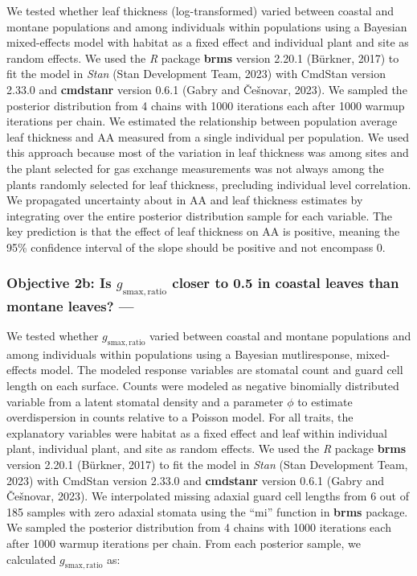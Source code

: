 \documentclass[
  letterpaper,
  DIV=11,
  numbers=noendperiod]{scrartcl}
\begin{document}
We tested whether leaf thickness (log-transformed) varied between
coastal and montane populations and among individuals within populations
using a Bayesian mixed-effects model with habitat as a fixed effect and
individual plant and site as random effects. We used the \emph{R}
package \textbf{brms} version 2.20.1 (Bürkner, 2017) to fit the model in
\emph{Stan} (Stan Development Team, 2023) with CmdStan version 2.33.0
and \textbf{cmdstanr} version 0.6.1 (Gabry and Češnovar, 2023). We
sampled the posterior distribution from 4 chains with 1000 iterations
each after 1000 warmup iterations per chain. We estimated the
relationship between population average leaf thickness and
\(\mathrm{AA}\) measured from a single individual per population. We
used this approach because most of the variation in leaf thickness was
among sites and the plant selected for gas exchange measurements was not
always among the plants randomly selected for leaf thickness, precluding
individual level correlation. We propagated uncertainty about in
\(\mathrm{AA}\) and leaf thickness estimates by integrating over the
entire posterior distribution sample for each variable. The key
prediction is that the effect of leaf thickness on \(\mathrm{AA}\) is
positive, meaning the 95\% confidence interval of the slope should be
positive and not encompass 0.

\hypertarget{objective-2b-is-g_mathrmsmaxratio-closer-to-0.5-in-coastal-leaves-than-montane-leaves}{%
\subsubsection{\texorpdfstring{Objective 2b: Is
\(g_{\mathrm{smax,ratio}}\) closer to 0.5 in coastal leaves than montane
leaves?
---}{Objective 2b: Is g\_\{\textbackslash mathrm\{smax,ratio\}\} closer to 0.5 in coastal leaves than montane leaves? ---}}\label{objective-2b-is-g_mathrmsmaxratio-closer-to-0.5-in-coastal-leaves-than-montane-leaves}}

We tested whether \(g_\mathrm{smax,ratio}\) varied between coastal and
montane populations and among individuals within populations using a
Bayesian mutliresponse, mixed-effects model. The modeled response
variables are stomatal count and guard cell length on each surface.
Counts were modeled as negative binomially distributed variable from a
latent stomatal density and a parameter \(\phi\) to estimate
overdispersion in counts relative to a Poisson model. For all traits,
the explanatory variables were habitat as a fixed effect and leaf within
individual plant, individual plant, and site as random effects. We used
the \emph{R} package \textbf{brms} version 2.20.1 (Bürkner, 2017) to fit
the model in \emph{Stan} (Stan Development Team, 2023) with CmdStan
version 2.33.0 and \textbf{cmdstanr} version 0.6.1 (Gabry and Češnovar,
2023). We interpolated missing adaxial guard cell lengths from 6 out of
185 samples with zero adaxial stomata using the ``mi'' function in
\textbf{brms} package. We sampled the posterior distribution from 4
chains with 1000 iterations each after 1000 warmup iterations per chain.
From each posterior sample, we calculated \(g_{\mathrm{smax,ratio}}\)
as:
\end{document}
